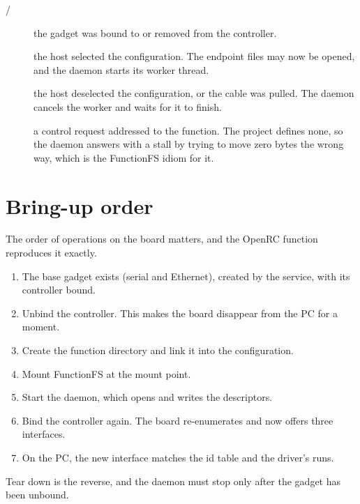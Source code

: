 \begin{description}
  \item[/] the gadget was bound to or removed from the controller.
  \item[] the host selected the configuration. The endpoint files may now be opened, and the daemon starts its worker thread.
  \item[] the host deselected the configuration, or the cable was pulled. The daemon cancels the worker and waits for it to finish.
  \item[] a control request addressed to the function. The project defines none, so the daemon answers with a stall by trying to move zero bytes the wrong way, which is the FunctionFS idiom for it.
\end{description}

\section{Bring-up order}

The order of operations on the board matters, and the OpenRC  function reproduces it exactly.

\begin{enumerate}
  \item The base gadget exists (serial and Ethernet), created by the  service, with its controller bound.
  \item Unbind the controller. This makes the board disappear from the PC for a moment.
  \item Create the function directory and link it into the configuration.
  \item Mount FunctionFS at the mount point.
  \item Start the daemon, which opens  and writes the descriptors.
  \item Bind the controller again. The board re-enumerates and now offers three interfaces.
  \item On the PC, the new interface matches the id table and the driver's  runs.
\end{enumerate}

Tear down is the reverse, and the daemon must stop only after the gadget has been unbound.
